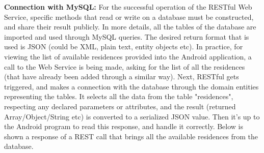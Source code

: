 \documentclass[12pt]{article}
\begin{document}
	\textbf{Connection with MySQL:} For the successful operation of the RESTful Web Service, specific methods that read or write on a database must be constructed, and share their result publicly. In more details, all the tables of the database are imported and used through MySQL queries. The desired return format that is used is JSON (could be XML, plain text, entity objects etc). In practice, for viewing the list of available residences provided into the Android application, a call to the Web Service is being made, asking for the list of all the residences (that have already been added through a similar way). Next, RESTful gets triggered, and makes a connection with the database through the domain entities representing the tables. It selects all the data from the table "residences", respecting any declared parameters or attributes, and the result (returned Array/Object/String etc) is converted to a serialized JSON value. Then it's up to the Android program to read this response, and handle it correctly. Below is shown a response of a REST call that brings all the available residences from the database.
	
\end{document}
